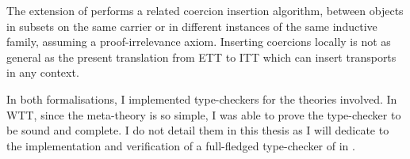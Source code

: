The   extension of \Coq performs a
related coercion insertion algorithm, between objects in subsets on the
same carrier or in different instances of the same inductive family,
assuming a proof-irrelevance axiom. Inserting coercions locally is not
as general as the present translation from \acrshort{ETT} to \acrshort{ITT}
which can insert transports in any context.


In both formalisations, I implemented type-checkers for the theories involved.
In \acrshort{WTT}, since the meta-theory is so simple, I was able to prove the
type-checker to be sound and complete. I do not detail them in this thesis as
I will dedicate  to the implementation and verification of
a full-fledged type-checker of \Coq in \Coq.